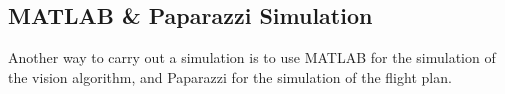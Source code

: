 \subsection{MATLAB \& Paparazzi Simulation}
Another way to carry out a simulation is to use MATLAB for the simulation of the vision algorithm, and Paparazzi for the simulation of the flight plan.